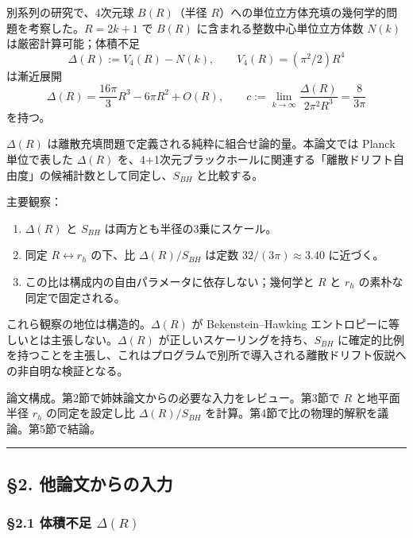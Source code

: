 \documentclass[a4paper,11pt]{ltjsarticle}
\theoremstyle{definition}
\providecommand{\tightlist}{\setlength{\itemsep}{0pt}\setlength{\parskip}{0pt}}
\begin{document}
別系列の研究で、4次元球 \(B(R)\)（半径
\(R\)）への単位立方体充填の幾何学的問題を考察した。\(R = 2k+1\) で
\(B(R)\) に含まれる整数中心単位立方体数 \(N(k)\)
は厳密計算可能；体積不足
\[\Delta(R) := V_4(R) - N(k), \qquad V_4(R) = (\pi^2/2) R^4\] は漸近展開
\[\Delta(R) = \frac{16\pi}{3} R^3 - 6\pi R^2 + O(R), \qquad c := \lim_{k\to\infty} \frac{\Delta(R)}{2\pi^2 R^3} = \frac{8}{3\pi}\]
を持つ。

\(\Delta(R)\) は離散充填問題で定義される純粋に組合せ論的量。本論文では
Planck 単位で表した \(\Delta(R)\)
を、4+1次元ブラックホールに関連する「離散ドリフト自由度」の候補計数として同定し、\(S_{BH}\)
と比較する。

主要観察：

\begin{enumerate}
\def\labelenumi{\arabic{enumi}.}
\tightlist
\item
  \(\Delta(R)\) と \(S_{BH}\) は両方とも半径の3乗にスケール。
\item
  同定 \(R \leftrightarrow r_h\) の下、比 \(\Delta(R)/S_{BH}\) は定数
  \(32/(3\pi) \approx 3.40\) に近づく。
\item
  この比は構成内の自由パラメータに依存しない；幾何学と \(R\) と \(r_h\)
  の素朴な同定で固定される。
\end{enumerate}

これら観察の地位は構造的。\(\Delta(R)\) が Bekenstein--Hawking
エントロピーに等しいとは主張しない。\(\Delta(R)\)
が正しいスケーリングを持ち、\(S_{BH}\)
に確定的比例を持つことを主張し、これはプログラムで別所で導入される離散ドリフト仮説への非自明な検証となる。

論文構成。第2節で姉妹論文からの必要な入力をレビュー。第3節で \(R\)
と地平面半径 \(r_h\) の同定を設定し比 \(\Delta(R)/S_{BH}\)
を計算。第4節で比の物理的解釈を議論。第5節で結論。

\begin{center}\rule{0.5\linewidth}{0.5pt}\end{center}

\subsection{§2.
他論文からの入力}\label{ux4ed6ux8ad6ux6587ux304bux3089ux306eux5165ux529b}

\subsubsection{\texorpdfstring{§2.1 体積不足
\(\Delta(R)\)}{§2.1 体積不足 \textbackslash Delta(R)}}\label{ux4f53ux7a4dux4e0dux8db3-deltar}
\end{document}

